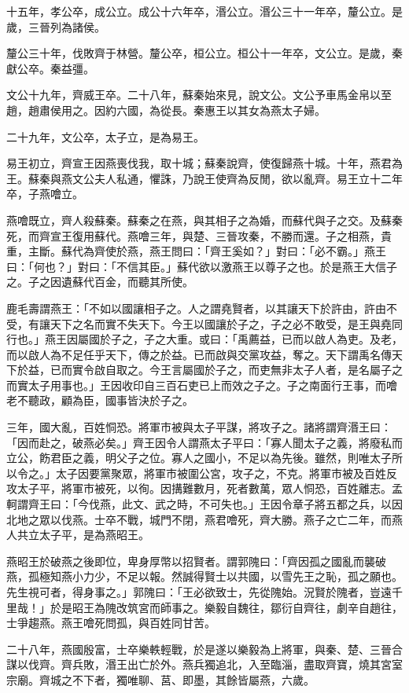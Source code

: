 \begin{pinyinscope}
十五年，孝公卒，成公立。成公十六年卒，湣公立。湣公三十一年卒，釐公立。是歲，三晉列為諸侯。

釐公三十年，伐敗齊于林營。釐公卒，桓公立。桓公十一年卒，文公立。是歲，秦獻公卒。秦益彊。

文公十九年，齊威王卒。二十八年，蘇秦始來見，說文公。文公予車馬金帛以至趙，趙肅侯用之。因約六國，為從長。秦惠王以其女為燕太子婦。

二十九年，文公卒，太子立，是為易王。

易王初立，齊宣王因燕喪伐我，取十城；蘇秦說齊，使復歸燕十城。十年，燕君為王。蘇秦與燕文公夫人私通，懼誅，乃說王使齊為反閒，欲以亂齊。易王立十二年卒，子燕噲立。

燕噲既立，齊人殺蘇秦。蘇秦之在燕，與其相子之為婚，而蘇代與子之交。及蘇秦死，而齊宣王復用蘇代。燕噲三年，與楚、三晉攻秦，不勝而還。子之相燕，貴重，主斷。蘇代為齊使於燕，燕王問曰：「齊王奚如？」對曰：「必不霸。」燕王曰：「何也？」對曰：「不信其臣。」蘇代欲以激燕王以尊子之也。於是燕王大信子之。子之因遺蘇代百金，而聽其所使。

鹿毛壽謂燕王：「不如以國讓相子之。人之謂堯賢者，以其讓天下於許由，許由不受，有讓天下之名而實不失天下。今王以國讓於子之，子之必不敢受，是王與堯同行也。」燕王因屬國於子之，子之大重。或曰：「禹薦益，已而以啟人為吏。及老，而以啟人為不足任乎天下，傳之於益。已而啟與交黨攻益，奪之。天下謂禹名傳天下於益，已而實令啟自取之。今王言屬國於子之，而吏無非太子人者，是名屬子之而實太子用事也。」王因收印自三百石吏已上而效之子之。子之南面行王事，而噲老不聽政，顧為臣，國事皆決於子之。

三年，國大亂，百姓恫恐。將軍市被與太子平謀，將攻子之。諸將謂齊湣王曰：「因而赴之，破燕必矣。」齊王因令人謂燕太子平曰：「寡人聞太子之義，將廢私而立公，飭君臣之義，明父子之位。寡人之國小，不足以為先後。雖然，則唯太子所以令之。」太子因要黨聚眾，將軍市被圍公宮，攻子之，不克。將軍市被及百姓反攻太子平，將軍市被死，以徇。因搆難數月，死者數萬，眾人恫恐，百姓離志。孟軻謂齊王曰：「今伐燕，此文、武之時，不可失也。」王因令章子將五都之兵，以因北地之眾以伐燕。士卒不戰，城門不閉，燕君噲死，齊大勝。燕子之亡二年，而燕人共立太子平，是為燕昭王。

燕昭王於破燕之後即位，卑身厚幣以招賢者。謂郭隗曰：「齊因孤之國亂而襲破燕，孤極知燕小力少，不足以報。然誠得賢士以共國，以雪先王之恥，孤之願也。先生視可者，得身事之。」郭隗曰：「王必欲致士，先從隗始。況賢於隗者，豈遠千里哉！」於是昭王為隗改筑宮而師事之。樂毅自魏往，鄒衍自齊往，劇辛自趙往，士爭趨燕。燕王噲死問孤，與百姓同甘苦。

二十八年，燕國殷富，士卒樂軼輕戰，於是遂以樂毅為上將軍，與秦、楚、三晉合謀以伐齊。齊兵敗，湣王出亡於外。燕兵獨追北，入至臨淄，盡取齊寶，燒其宮室宗廟。齊城之不下者，獨唯聊、莒、即墨，其餘皆屬燕，六歲。


\end{pinyinscope}
